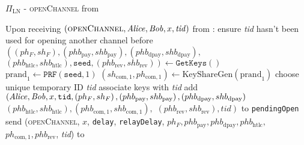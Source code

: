 \begin{protocolbox}{$\Pi_{\mathrm{LN}}$ - \textsc{openChannel} from
\environment}
  \label{alg:protocol:open:env}
  \begin{algorithmic}[1]
    \State Upon receiving $\left(\textsc{openChannel}, \mathit{Alice}, \mathit{Bob}, x,
    \mathit{tid}\right)$ from \environment:
    \Indent
      \State ensure \textit{tid} hasn't been used for opening another channel
      before
      \State $\left(\left(ph_F, sh_F\right), \left(phb_{\mathrm{pay}},
      shb_{\mathrm{pay}}\right), \left(phb_{\mathrm{dpay}},
      shb_{\mathrm{dpay}}\right),\right.$
      $\left.\left(phb_{\mathrm{htlc}}, shb_{\mathrm{htlc}}\right),
      \mathtt{seed}, \left(phb_{\mathrm{rev}}, shb_{\mathrm{rev}}\right)\right)
      \gets \texttt{GetKeys}\left(\right)$
      \State $\mathrm{prand}_1 \gets \texttt{PRF}\left(\mathtt{seed}, 1\right)$
      \State $\left(sh_{\mathrm{com}, 1}, ph_{\mathrm{com}, 1}\right) \gets
      \mathrm{KeyShareGen}\left(\mathrm{prand}_1\right)$
      \State choose unique temporary ID \textit{tid} 
      \State associate keys with \textit{tid}
      \State add $\left(\mathit{Alice}, \mathit{Bob}, x, \mathtt{tid}, \left(ph_F, sh_F\right),
      \left(phb_{\mathrm{pay}}, shb_{\mathrm{pay}}\right),
      \left(phb_{\mathrm{dpay}}, shb_{\mathrm{dpay}}\right)\right.$
      $\left.\left(phb_{\mathrm{htlc}}, shb_{\mathrm{htlc}}\right),
      \left(phb_{\mathrm{com}, 1}, shb_{\mathrm{com}, 1}\right),\right.$
      $\left.\left(phb_{\mathrm{rev}}, shb_{\mathrm{rev}}\right),
      \mathit{tid}\right)$ to \texttt{pendingOpen}
      \State send (\textsc{openChannel}, $x$, \texttt{delay},
      \texttt{relayDelay}, $ph_F, phb_{\mathrm{pay}},
      phb_{\mathrm{dpay}}, phb_{\mathrm{htlc}},$
      $ph_{\mathrm{com}, 1}, phb_{\mathrm{rev}}$, \textit{tid}) to
      \bob{}
    \EndIndent
  \end{algorithmic}
\end{protocolbox}

